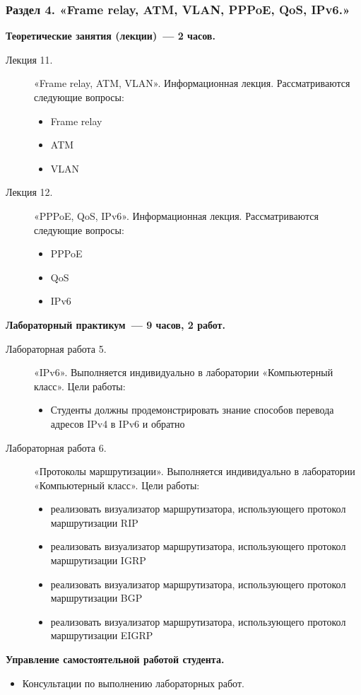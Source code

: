 \subsubsection{Раздел 4. «Frame relay, ATM, VLAN, PPPoE, QoS, IPv6.»}

{\parindent0pt

\textbf{Теоретические занятия (лекции)~— 2 часов.}
\begin{description}
\item[Лекция 11.] «Frame relay, ATM, VLAN». Информационная лекция. Рассматриваются следующие вопросы: \begin{itemize}
\item Frame relay\item ATM\item VLAN
\end{itemize}\item[Лекция 12.] «PPPoE, QoS, IPv6». Информационная лекция. Рассматриваются следующие вопросы: \begin{itemize}
\item PPPoE\item QoS\item IPv6
\end{itemize}
\end{description}




\textbf{Лабораторный практикум~— 9 часов, 2 работ.}
\begin{description}
\item[Лабораторная работа 5.] «IPv6». Выполняется индивидуально в лаборатории «Компьютерный класс». Цели работы: \begin{itemize}
\item Студенты должны продемонстрировать знание способов перевода адресов IPv4 в IPv6 и обратно
\end{itemize}\item[Лабораторная работа 6.] «Протоколы маршрутизации». Выполняется индивидуально в лаборатории «Компьютерный класс». Цели работы: \begin{itemize}
\item реализовать визуализатор маршрутизатора, использующего протокол маршрутизации RIP\item реализовать визуализатор маршрутизатора, использующего протокол маршрутизации IGRP\item реализовать визуализатор маршрутизатора, использующего протокол маршрутизации BGP\item реализовать визуализатор маршрутизатора, использующего протокол маршрутизации EIGRP
\end{itemize}
\end{description}

\textbf{Управление самостоятельной работой студента.}
\begin{itemize}
\item Консультации по выполнению лабораторных работ.
\end{itemize}
}



